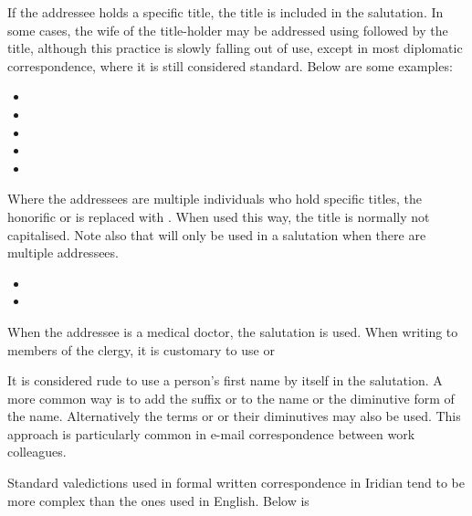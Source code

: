 If the addressee holds a specific title, the title is included in the salutation. In some cases, the wife of the
title-holder may be addressed using  followed by the title, although this practice is slowly falling out
of use, except in most diplomatic correspondence, where it is still considered standard. Below are some examples:


\begin{itemize}[nosep]
	\item {}
	\item {}
	\item {}
	\item {}
	\item {}
\end{itemize}

Where the addressees are multiple individuals who hold specific titles, the honorific  or  is replaced with . When used this way, the title is normally not capitalised. Note also that  will only be used in a salutation when there are multiple addressees.

\begin{itemize}[nosep]
	\item {}
	\item {}
\end{itemize}

When the addressee is a medical doctor, the salutation  is used. When writing to members of the clergy, it is customary to use  or 

It is considered rude to use a person's first name by itself in the salutation. A more common way is to add the suffix  or  to the name or the diminutive form of the name. Alternatively the terms  or  or their diminutives may also be used. This approach is particularly common in e-mail correspondence between work colleagues.

Standard valedictions used in formal written correspondence in Iridian tend to be more complex than the ones used in English. Below is 

